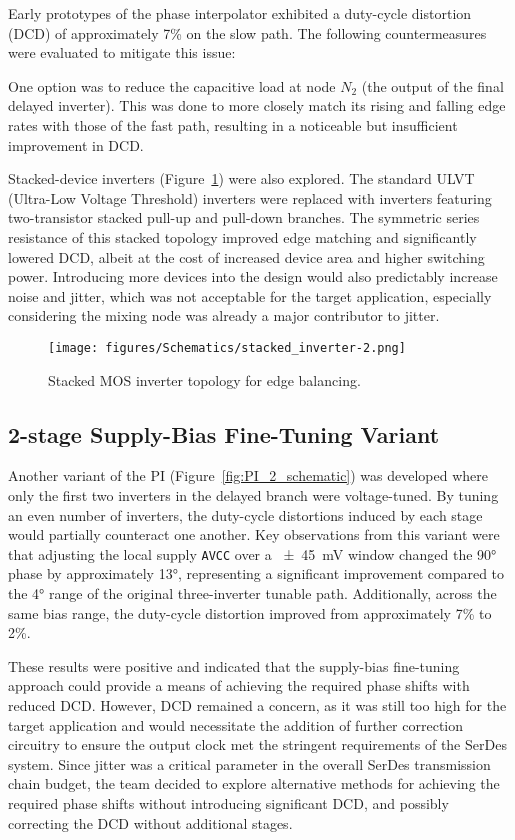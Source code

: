 Early prototypes of the phase interpolator exhibited a duty-cycle distortion (DCD) of approximately 7\% on the slow path. The following countermeasures were evaluated to mitigate this issue:

One option was to reduce the capacitive load at node $N_2$ (the output of the final delayed inverter). This was done to more closely match its rising and falling edge rates with those of the fast path, resulting in a noticeable but insufficient improvement in DCD.

Stacked-device inverters (Figure~\ref{fig:stacked_inv}) were also explored. The standard ULVT (Ultra-Low Voltage Threshold) inverters were replaced with inverters featuring two-transistor stacked pull-up and pull-down branches. The symmetric series resistance of this stacked topology improved edge matching and significantly lowered DCD, albeit at the cost of increased device area and higher switching power. Introducing more devices into the design would also predictably increase noise and jitter, which was not acceptable for the target application, especially considering the mixing node was already a major contributor to jitter.

\begin{figure}[H]
  \centering
  \texttt{[image: figures/Schematics/stacked\_inverter-2.png]}
  \caption{Stacked MOS inverter topology for edge balancing.}
  \label{fig:stacked_inv}
\end{figure}

\subsection{2-stage Supply-Bias Fine-Tuning Variant}\label{sec:avcc_finetune}

Another variant of the PI (Figure~\ref{fig:PI_2_schematic}) was developed where only the first two inverters in the delayed branch were voltage-tuned. By tuning an even number of inverters, the duty-cycle distortions induced by each stage would partially counteract one another. Key observations from this variant were that adjusting the local supply \texttt{AVCC} over a \SI{\pm45}{\milli\volt} window changed the \ang{90} phase by approximately \ang{13}, representing a significant improvement compared to the \ang{4} range of the original three-inverter tunable path. Additionally, across the same bias range, the duty-cycle distortion improved from approximately 7\% to 2\%.

These results were positive and indicated that the supply-bias fine-tuning approach could provide a means of achieving the required phase shifts with reduced DCD. However, DCD remained a concern, as it was still too high for the target application and would necessitate the addition of further correction circuitry to ensure the output clock met the stringent requirements of the SerDes system. Since jitter was a critical parameter in the overall SerDes transmission chain budget, the team decided to explore alternative methods for achieving the required phase shifts without introducing significant DCD, and possibly correcting the DCD without additional stages.

